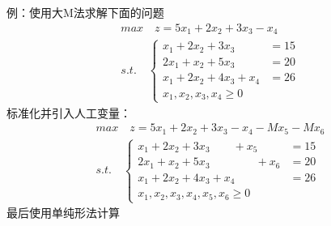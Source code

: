 \documentclass{book}
\begin{document}
例：使用大M法求解下面的问题
$$
\begin{aligned}
    &max\quad z=5x_1+2x_2+3x_3-x_4&\\
    &s.t.\quad
    \begin{cases}
        x_1+2x_2+3x_3&= 15\\
        2x_1+x_2+5x_3&= 20\\
        x_1+2x_2+4x_3+x_4&= 26\\
        x_1,x_2,x_3,x_4\ge0
    \end{cases}
\end{aligned}
$$
标准化并引入人工变量：
$$
\begin{aligned}
    &max\quad z=5x_1+2x_2+3x_3-x_4-Mx_5-Mx_6&\\
    &s.t.\quad
    \begin{cases}
        x_1+2x_2+3x_3\qquad+x_5&= 15\\
        2x_1+x_2+5x_3\qquad\qquad+x_6&= 20\\
        x_1+2x_2+4x_3+x_4&= 26\\
        x_1,x_2,x_3,x_4,x_5,x_6\ge0
    \end{cases}
\end{aligned}
$$
最后使用单纯形法计算
\end{document}
